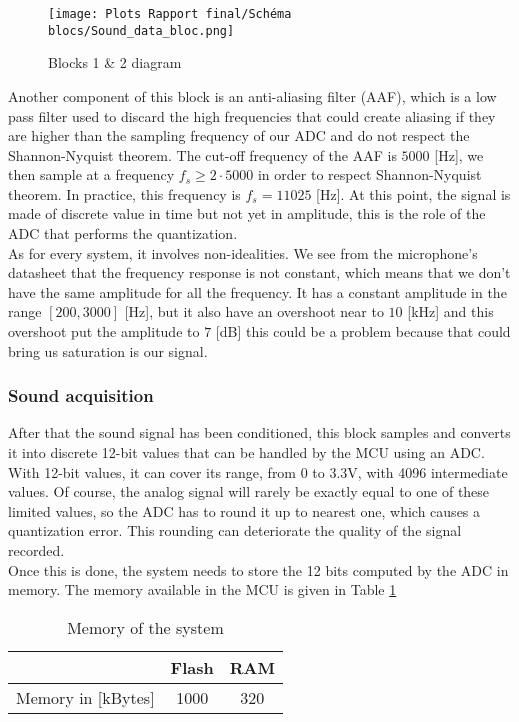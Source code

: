 \documentclass{article}
\begin{document}
\begin{figure}[h]  %
    \centering
    \texttt{[image: Plots Rapport final/Schéma blocs/Sound\_data\_bloc.png]}
    \caption{Blocks 1 \& 2 diagram}
    \label{fig:enter-label}
\end{figure}

Another component of this block is an anti-aliasing filter (AAF),  which is a low pass filter used to discard the high frequencies that could create aliasing if they are higher than the sampling frequency of our ADC and do not respect the Shannon-Nyquist theorem. The cut-off frequency of the AAF is $5000$ [Hz], we then sample at a frequency $f_s \geq 2 \cdot 5000$ in order to respect Shannon-Nyquist theorem. In practice, this frequency is $f_s = 11025$ [Hz]. At this point, the signal is made of discrete value in time but not yet in amplitude, this is the role of the ADC that performs the quantization. \\

As for every system, it involves non-idealities. We see from the microphone's datasheet that the frequency response is not constant, which means that we don't have the same amplitude for all the frequency. It has a constant amplitude in the range $[200, 3000]$ [Hz], but it also have an overshoot near to $10$ [kHz] and this overshoot put the amplitude to $7$ [dB] this could be a problem because that could bring us saturation is our signal. \\

\subsubsection{Sound acquisition}

After that the sound signal has been conditioned, this block samples and converts it into discrete 12-bit values that can be handled by the MCU using an ADC. With 12-bit values, it can cover its range, from 0 to 3.3V, with 4096 intermediate values. Of course, the analog signal will rarely be exactly equal to one of these limited values, so the ADC has to round it up to nearest one, which causes a quantization error. This rounding can deteriorate the quality of the signal recorded. \\

Once this is done, the system needs to store the 12 bits computed by the ADC in memory. The memory available in the MCU is given in Table \ref{MCU memory}

\begin{table}[H]
    \centering
    \begin{tabular}{|c|c|c|}
        \hline
        & Flash & RAM \\
        \hline
        Memory in [kBytes] & 1000 & 320 \\
        \hline
    \end{tabular}
    \caption{Memory of the system}
    \label{MCU memory}
\end{table}
\end{document}
